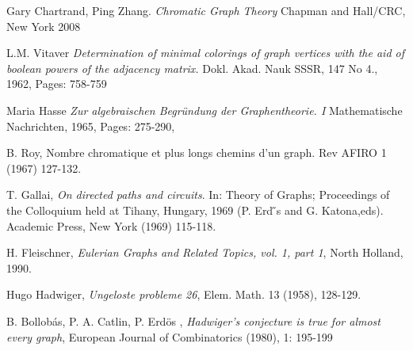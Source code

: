 {\begin{thebibliography}{9}
 Gary Chartrand, Ping Zhang. \textit{Chromatic Graph Theory} Chapman and Hall/CRC, New York 2008

 L.M. Vitaver \textit{Determination of minimal colorings of graph vertices with the aid of boolean powers of the adjacency matrix.} Dokl. Akad. Nauk SSSR, 147 No 4., 1962, Pages: 758-759

 Maria Hasse \textit{Zur algebraischen Begr\"undung der Graphentheorie. I} Mathematische Nachrichten, 1965, Pages: 275-290,

B. Roy, Nombre chromatique et plus longs chemins d'un graph. Rev AFIRO
1 (1967) 127-132.

\newpage

T. Gallai, \textit{On directed paths and circuits}. In: Theory of Graphs; Proceedings of the Colloquium held at Tihany, Hungary, 1969 (P. Erd ̋s and G. Katona,eds). Academic Press, New York (1969) 115-118.

 H. Fleischner, \textit{Eulerian Graphs and Related Topics, vol. 1, part 1}, North Holland, 1990.

 Hugo Hadwiger, \textit{Ungeloste probleme 26}, Elem. Math. 13 (1958), 128-129.

 B. Bollobás, P. A. Catlin, P.  Erd\"os , \textit{Hadwiger's conjecture is true for almost every graph}, European Journal of Combinatorics (1980), 1: 195-199


\end{thebibliography}
}
